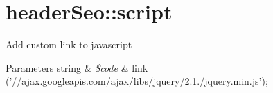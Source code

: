 \hypertarget{header_seo_1_1script-example}{\section{header\-Seo\-::script}
}
Add custom link to javascript 
\begin{DoxyParams}[1]{Parameters}
string & {\em \$code} & link ('//ajax.googleapis.\-com/ajax/libs/jquery/2.1./jquery.min.\-js');\\
\hline
\end{DoxyParams}

\begin{DoxyCodeInclude}
\end{DoxyCodeInclude}
 